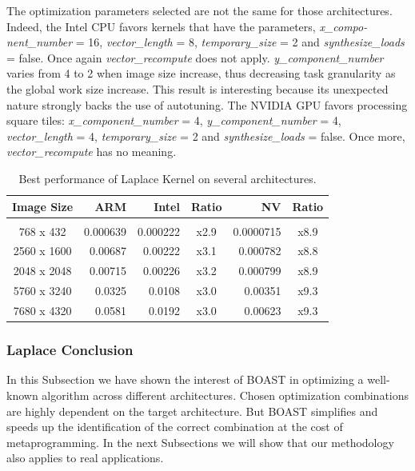 \documentclass{IEEEtran}
\begin{document}
The optimization parameters selected are not the same for those architectures.
Indeed, the Intel CPU favors kernels that have the parameters,
\emph{x\_compo-nent\_number} = 16, \emph{vector\_length} = 8,
\emph{temporary\_size} = 2 and \emph{synthesize\_loads} = false. Once again
\emph{vector\_recompute} does not apply. \emph{y\_component\_number} varies
from 4 to 2 when image size increase, thus decreasing task granularity as the
global work size increase. This result is interesting because its unexpected
nature strongly backs the use of autotuning. The NVIDIA GPU favors processing
square tiles: \emph{x\_component\_number} = 4, \emph{y\_component\_number} = 4,
\emph{vector\_length} = 4, \emph{temporary\_size} = 2 and
\emph{synthesize\_loads} = false. Once more, \emph{vector\_recompute} has no
meaning.

\begin{table}
\caption{Best performance of Laplace Kernel on several architectures.}
\label{tbl:other}
\centering
\begin{tabular}{c|r|r|c|r|c}
  Image Size & ARM & Intel & Ratio & NV & Ratio \\[4pt]
  \hline&&&&\\[-8pt]
768 x 432   & 0.000639     & 0.000222    & x2.9  & 0.0000715    & x8.9  \\
2560 x 1600 & 0.00687      & 0.00222     & x3.1  & 0.000782     & x8.8  \\
2048 x 2048 & 0.00715      & 0.00226     & x3.2  & 0.000799     & x8.9  \\
5760 x 3240 & 0.0325       & 0.0108      & x3.0  & 0.00351      & x9.3  \\
7680 x 4320 & 0.0581       & 0.0192      & x3.0  & 0.00623      & x9.3  \\
\end{tabular}
\end{table}

\subsubsection{Laplace Conclusion}

In this Subsection we have shown the interest of BOAST in optimizing a
well-known algorithm across different architectures. Chosen optimization
combinations are highly dependent on the target architecture. But BOAST
simplifies and speeds up the identification of the correct combination at the
cost of metaprogramming. In the next Subsections we will show that our
methodology also applies to real applications.
\end{document}
